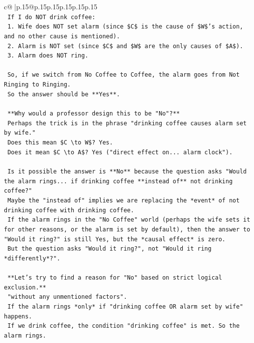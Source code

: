 \documentclass{article}
\begin{document}
{\begin{supertabular}{c@{$\;$}|p{.15\linewidth}@{}p{.15\linewidth}p{.15\linewidth}p{.15\linewidth}p{.15\linewidth}p{.15\linewidth}}
{{{\\ 
\texttt{        If I do NOT drink coffee:} \\
\texttt{        1. Wife does NOT set alarm (since \$C\$ is the cause of \$W\$'s action, and no other cause is mentioned).} \\
\texttt{        2. Alarm is NOT set (since \$C\$ and \$W\$ are the only causes of \$A\$).} \\
\texttt{        3. Alarm does NOT ring.} \\
\\ 
\texttt{        So, if we switch from No Coffee to Coffee, the alarm goes from Not Ringing to Ringing.} \\
\texttt{        So the answer should be **Yes**.} \\
\\ 
\texttt{        **Why would a professor design this to be "No"?**} \\
\texttt{        Perhaps the trick is in the phrase "drinking coffee causes alarm set by wife."} \\
\texttt{        Does this mean \$C \textbackslash{}to W\$? Yes.} \\
\texttt{        Does it mean \$C \textbackslash{}to A\$? Yes ("direct effect on... alarm clock").} \\
\\ 
\texttt{        Is it possible the answer is **No** because the question asks "Would the alarm rings... if drinking coffee **instead of** not drinking coffee?"} \\
\texttt{        Maybe the "instead of" implies we are replacing the *event* of not drinking coffee with drinking coffee.} \\
\texttt{        If the alarm rings in the "No Coffee" world (perhaps the wife sets it for other reasons, or the alarm is set by default), then the answer to "Would it ring?" is still Yes, but the *causal effect* is zero.} \\
\texttt{        But the question asks "Would it ring?", not "Would it ring *differently*?".} \\
\\ 
\texttt{        **Let's try to find a reason for "No" based on strict logical exclusion.**} \\
\texttt{        "without any unmentioned factors".} \\
\texttt{        If the alarm rings *only* if "drinking coffee OR alarm set by wife" happens.} \\
\texttt{        If we drink coffee, the condition "drinking coffee" is met. So the alarm rings.} \\
}}}
\end{supertabular}}
\end{document}
